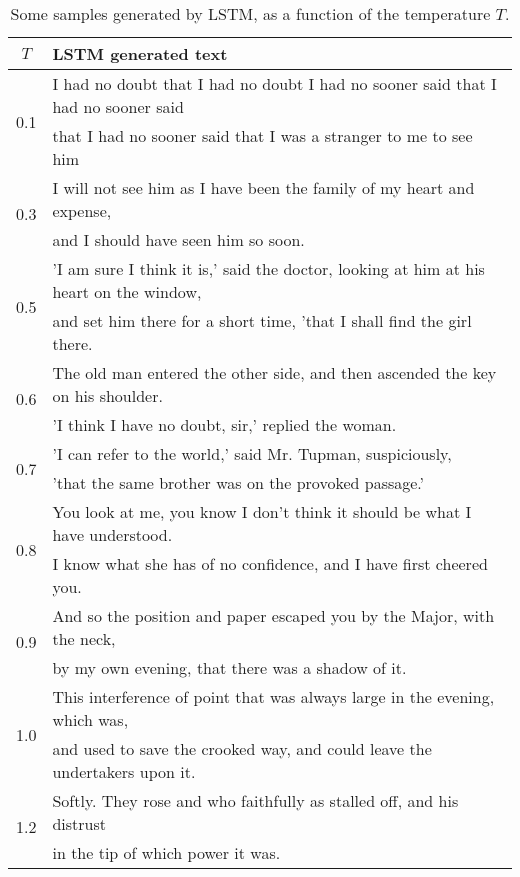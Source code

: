 \documentclass[journal]{IEEEtran}
\begin{document}
\begin{table*}
  \begin{center}
    \caption{Some samples generated by LSTM, as a function of the temperature
$T$.\label{tab:text_samples}}
  \begin{tabular}{|c|l|}
  \hline
  $T$ & LSTM generated text \\
  \hline
  \multirow{2}{*}{0.1} & I had no doubt that I had no doubt I had no sooner said
that I had no sooner said\\
  & that I had no sooner said that I was a stranger to me to see him\\
  \hline
  \multirow{2}{*}{0.3} & I will not see him as I have been the family of my heart and expense,\\
  & and I should have seen him so soon.\\
  \hline
  \multirow{2}{*}{0.5} & 'I am sure I think it is,' said the doctor, looking at
him at his heart on the window,\\
  & and set him there for a short time, 'that I shall find the girl there.\\
  \hline
  \multirow{2}{*}{0.6} & The old man entered the other side, and then ascended the key on his shoulder.\\
  & 'I think I have no doubt, sir,' replied the woman. \\
  \hline
  \multirow{2}{*}{0.7} & 'I can refer to the world,' said Mr. Tupman, suspiciously,\\
  & 'that the same brother was on the provoked passage.' \\
  \hline
  \multirow{2}{*}{0.8} & You look at me, you know I don’t think it should be what I have understood.\\
  & I know what she has of no confidence, and I have first cheered you.\\
  \hline
  \multirow{2}{*}{0.9} & And so the position and paper escaped you by the Major, with the neck,\\
  & by my own evening, that there was a shadow of it. \\
  \hline
  \multirow{2}{*}{1.0} & This interference of point that was always large in the evening, which was,\\
  & and used to save the crooked way, and could leave the undertakers upon it.\\
  \hline
  \multirow{2}{*}{1.2} & Softly. They rose and who faithfully as stalled off, and his distrust\\
  & in the tip of which power it was.  \\

\end{tabular}
\end{center}
\end{table*}
\end{document}
